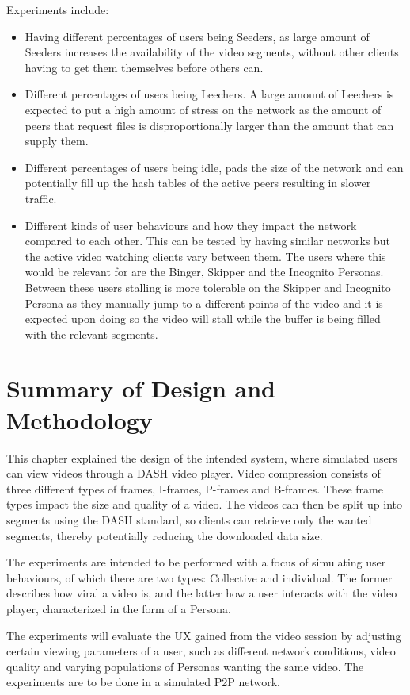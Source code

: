 Experiments include:
\begin{itemize}
\item Having different percentages of users being Seeders, as large amount of Seeders increases the availability of the video segments, without other clients having to get them themselves before others can.

\item Different percentages of users being Leechers. A large amount of Leechers is expected to put a high amount of stress on the network as the amount of peers that request files is disproportionally larger than the amount that can supply them.

\item Different percentages of users being idle, pads the size of the network and can potentially fill up the hash tables of the active peers resulting in slower traffic.

\item Different kinds of user behaviours and how they impact the network compared to each other. This can be tested by having similar networks but the active video watching clients vary between them. The users where this would be relevant for are the Binger, Skipper and the Incognito Personas. Between these users stalling is more tolerable on the Skipper and Incognito Persona as they manually jump to a different points of the video and it is expected upon doing so the video will stall while the buffer is being filled with the relevant segments.
\end{itemize}

\section{Summary of Design and Methodology}
This chapter explained the design of the intended system, where simulated users can view videos through a \ac{DASH} video player. Video compression consists of three different types of frames, \acp{I-frame}, \acp{P-frame} and \acp{B-frame}. These frame types impact the size and quality of a video. The videos can then be split up into segments using the \ac{DASH} standard, so clients can retrieve only the wanted segments, thereby potentially reducing the downloaded data size.

The experiments are intended to be performed with a focus of simulating user behaviours, of which there are two types: Collective and individual. The former describes how viral a video is, and the latter how a user interacts with the video player, characterized in the form of a Persona.

The experiments will evaluate the \ac{UX} gained from the video session by adjusting certain viewing parameters of a user, such as different network conditions, video quality and varying populations of Personas wanting the same video. The experiments are to be done in a simulated \ac{P2P} network.
